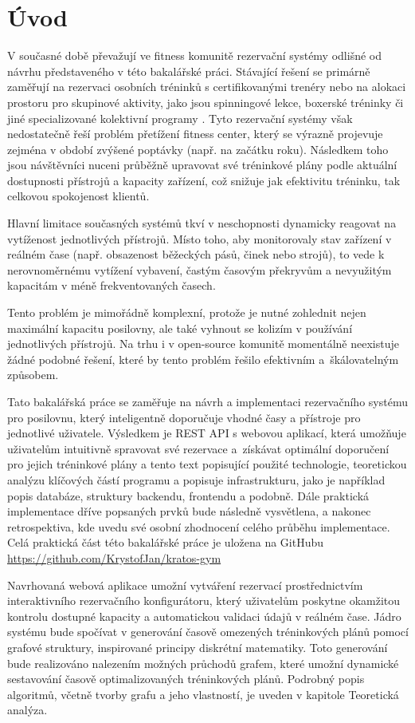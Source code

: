 \chapter{Úvod} \label{intro}
\label{sec:Introduction}
V současné době převažují ve fitness komunitě rezervační systémy odlišné od návrhu představeného v této bakalářské práci. Stávající řešení se primárně zaměřují na rezervaci osobních tréninků s certifikovanými trenéry nebo na alokaci prostoru pro skupinové aktivity, jako jsou spinningové lekce, boxerské tréninky či jiné specializované kolektivní programy \cite{gymmasterManagementSoftware, mindbodyonlineBestFitness}. Tyto rezervační systémy však nedostatečně řeší problém přetížení fitness center, který se výrazně projevuje zejména v období zvýšené poptávky (např. na začátku roku). Následkem toho jsou návštěvníci nuceni průběžně upravovat své tréninkové plány podle aktuální dostupnosti přístrojů a kapacity zařízení, což snižuje jak efektivitu tréninku, tak celkovou spokojenost klientů.

Hlavní limitace současných systémů tkví v neschopnosti dynamicky reagovat na vytíženost jednotlivých přístrojů. Místo toho, aby monitorovaly stav zařízení v reálném čase (např. obsazenost běžeckých pásů, činek nebo strojů), to vede k nerovnoměrnému vytížení vybavení, častým časovým překryvům a nevyužitým kapacitám v méně frekventovaných časech.

Tento problém je mimořádně komplexní, protože je nutné zohlednit nejen maximální kapacitu posilovny, ale také vyhnout se kolizím v používání jednotlivých přístrojů. Na trhu i v open-source komunitě momentálně neexistuje žádné podobné řešení, které by tento problém řešilo efektivním a~škálovatelným způsobem\cite{bookywayPrenotazioneUniversale}.

Tato bakalářská práce se zaměřuje na návrh a implementaci rezervačního systému pro posilovnu, který inteligentně doporučuje vhodné časy a přístroje pro jednotlivé uživatele. Výsledkem je REST API s webovou aplikací, která umožňuje uživatelům intuitivně spravovat své rezervace a~získávat optimální doporučení pro jejich tréninkové plány a tento text popisující použité technologie, teoretickou analýzu klíčových částí programu a popisuje infrastrukturu, jako je například popis databáze, struktury backendu, frontendu a podobně. Dále praktická implementace dříve popsaných prvků bude následně vysvětlena, a nakonec retrospektiva, kde uvedu své osobní zhodnocení celého průběhu implementace. Celá praktická část této bakalářské práce je uložena na GitHubu \url{https://github.com/KrystofJan/kratos-gym}

Navrhovaná webová aplikace umožní vytváření rezervací prostřednictvím interaktivního rezervačního konfigurátoru, který uživatelům poskytne okamžitou kontrolu dostupné kapacity a automatickou validaci údajů v reálném čase. Jádro systému bude spočívat v generování časově omezených tréninkových plánů pomocí grafové struktury, inspirované principy diskrétní matematiky. Toto generování bude realizováno nalezením možných průchodů grafem, které umožní dynamické sestavování časově optimalizovaných tréninkových plánů. Podrobný popis algoritmů, včetně tvorby grafu a jeho vlastností, je uveden v kapitole Teoretická analýza.
\endinput
